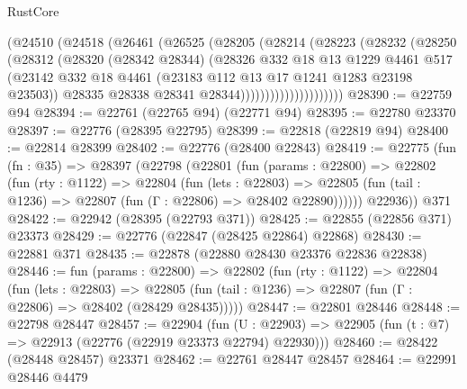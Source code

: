 \begin{lexlean}{RustCore}
\begin{coremodule}
                      (@24510
                        (@24518
                          (@26461
                            (@26525
                              (@28205
                                (@28214
                                  (@28223
                                    (@28232
                                      (@28250
                                        (@28312
                                          (@28320
                                            (@28342 @28344)
                                            (@28326
                                              @332
                                              @18
                                              @13
                                              @1229
                                              @4461
                                              @517
                                              (@23142
                                                @332
                                                @18
                                                @4461
                                                (@23183 @112 @13 @17 @1241 @1283 @23198 @23503))
                                              @28335
                                              @28338
                                              @28341
                                              @28344)))))))))))))))))))))
@28390 := @22759 @94
@28394 := @22761 (@22765 @94) (@22771 @94)
@28395 := @22780 @23370
@28397 := @22776 (@28395 @22795)
@28399 := @22818 (@22819 @94)
@28400 := @22814 @28399
@28402 := @22776 (@28400 @22843)
@28419 := @22775
    (fun (fn : @35) =>
    @28397
      (@22798
        (@22801
          (fun (params : @22800) =>
          @22802
            (fun (rty : @1122) =>
            @22804
              (fun (lets : @22803) =>
              @22805 (fun (tail : @1236) => @22807 (fun (Γ : @22806) => @28402 @22890))))))
        @22936))
    @371
@28422 := @22942 (@28395 (@22793 @371))
@28425 := @22855 (@22856 @371) @23373
@28429 := @22776 (@22847 (@28425 @22864) @22868)
@28430 := @22881 @371
@28435 := @22878 (@22880 @28430 @23376 @22836 @22838)
@28446 := fun (params : @22800) =>
  @22802
    (fun (rty : @1122) =>
    @22804
      (fun (lets : @22803) =>
      @22805 (fun (tail : @1236) => @22807 (fun (Γ : @22806) => @28402 (@28429 @28435)))))
@28447 := @22801 @28446
@28448 := @22798 @28447
@28457 := @22904
    (fun (U : @22903) => @22905 (fun (t : @7) => @22913 (@22776 (@22919 @23373 @22794) @22930)))
@28460 := @28422 (@28448 @28457) @23371
@28462 := @22761 @28447 @28457
@28464 := @22991 @28446 @4479

\end{coremodule}
\end{lexlean}
